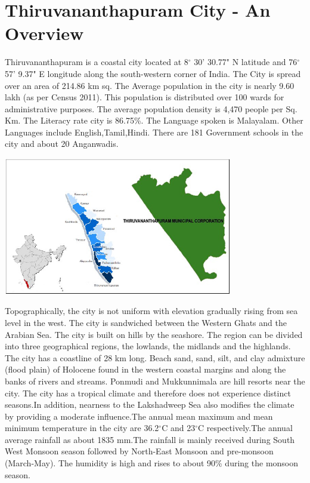\documentclass[12pt,a4paper]{report}
\begin{document}
\section{Thiruvananthapuram City - An Overview}
\begin{justify}
	Thiruvananthapuram is a coastal city located at 8$^\circ$ 30' 30.77" N latitude and 76$^\circ$ 57' 9.37" E longitude along the south-western corner of India. The City is spread over an area of 214.86 km sq. The Average population in the city is nearly 9.60 lakh (as per Census 2011). This population is distributed over 100 wards for administrative purposes. The average population density is 4,470 people per Sq. Km. The Literacy rate city is 86.75\%. The Language spoken is Malayalam. Other Languages include English,Tamil,Hindi. There are 181 Government schools in the city and about 20 Anganwadis.	
	\vspace{3mm}
\end{justify}
\begin{justify}
		\centering
		\includegraphics[width=0.75\textwidth]{ward_map_of_tvm}
\end{justify}
\vspace{5mm}
\begin{justify}
	Topographically, the city is not uniform with elevation gradually rising from sea level in the west. The city is sandwiched between the Western Ghats and the Arabian Sea. The city is built on hills by the seashore. The region can be divided into three geographical regions, the lowlands, the midlands and the highlands. The city has a coastline of 28 km long. Beach sand, sand, silt, and clay admixture (flood plain) of Holocene found in the western coastal margins and along the banks of rivers and streams. Ponmudi and Mukkunnimala are hill resorts near the city.
	The city has a tropical climate and therefore does not experience distinct seasons.In addition, nearness to the Lakshadweep Sea also modifies the climate by providing a moderate influence.The annual mean maximum and mean minimum temperature in the city are 36.2$^\circ$C and 23$^\circ$C respectively.The annual average rainfall as about 1835 mm.The rainfall is mainly received during South West Monsoon season followed by North-East Monsoon and pre-monsoon (March-May). The humidity is high and rises to about 90\% during the monsoon season.
	
	
\end{justify}	
\end{document}
